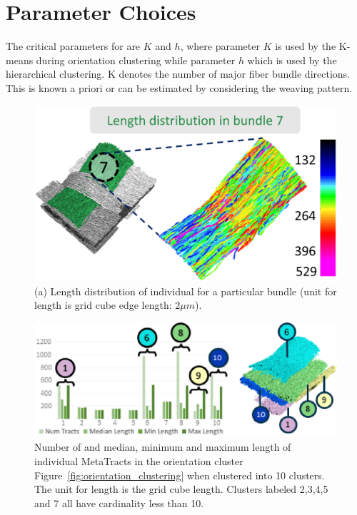 \section{Parameter Choices}\label{sec:param_choices}
The critical parameters for \mt are $K$ and $h$, where parameter $K$ is used by the K-means during orientation clustering while parameter $h$ which is used by the hierarchical clustering.
K denotes the number of major fiber bundle directions. This is known a priori or can be estimated by considering the weaving pattern. 
\begin{figure}[tb]
	\centering
	\includegraphics[width=0.8\linewidth]{images/lengthDistribution.eps}
	\caption{(a) Length distribution of individual \mt for a particular bundle (unit for length is grid cube edge length:  $2\mu m$).}
	\label{fig:length_distribution}
\end{figure}
\begin{figure}[tb]
	\centering
	\includegraphics[width=\linewidth,  trim = 0mm 0mm 0mm 00mm, clip]{images/figure9_AMA.eps}
	\caption{Number of \mt and median, minimum and maximum length of individual MetaTracts in the orientation cluster Figure~\ref{fig:orientation_clustering} when clustered into 10 clusters. The unit for length is the grid cube length. Clusters labeled 2,3,4,5 and 7 all have cardinality less than 10. }
	\label{fig:len_dist_crop16} 
\end{figure}
